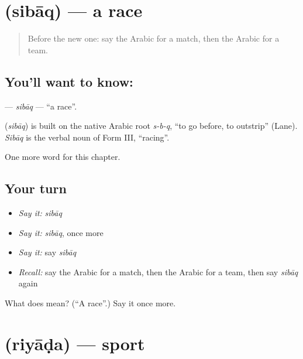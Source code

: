 \section[\texorpdfstring{\ar{سباق} (sibāq)}{سباق (sibāq)}]{ (sibāq) — a race}

\label{lesson:AR-C277-sibaq}



\begin{quote}
Before the new one: say the Arabic for a match, then the Arabic for a team.
\end{quote}

\subsection*{You'll want to know: }
\textbf{} — \emph{sibāq} — \textquotedblleft{}a race\textquotedblright{}.

\begin{cousinweb}
\textbf{} (\emph{sibāq}) is built on the native Arabic root \emph{s-b-q}, \textquotedblleft{}to go before, to outstrip\textquotedblright{} (Lane). \emph{Sibāq} is the verbal noun of Form III, \textquotedblleft{}racing\textquotedblright{}.
\end{cousinweb}

\begin{grammarlens}[title={What you've built}]
One more word for this chapter.
\end{grammarlens}

\subsection*{Your turn}
\begin{itemize}
\raggedright
  \item \emph{Say it:} \emph{sibāq}
  \item \emph{Say it:} \emph{sibāq}, once more
  \item \emph{Say it:} say \emph{sibāq}
  \item \emph{Recall:} say the Arabic for a match, then the Arabic for a team, then say \emph{sibāq} again
\end{itemize}

\begin{tcolorbox}[breakable,colback=teal!4,colframe=teal!35!black,title={Before you move on}]
What does  mean? (\textquotedblleft{}A race\textquotedblright{}.) Say it once more.
\end{tcolorbox}
\section[\texorpdfstring{\ar{رياضة} (riyāḍa)}{رياضة (riyāḍa)}]{ (riyāḍa) — sport}

